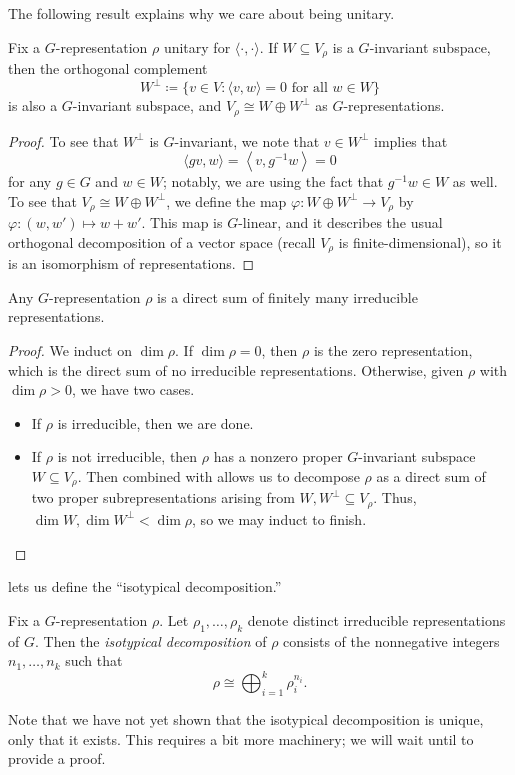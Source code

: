 \documentclass[../main.tex]{subfiles}
\begin{document}
The following result explains why we care about being unitary.
\begin{lemma} \label{lem:get-ortho-comp}
	Fix a $G$-representation $\rho$ unitary for $\langle\cdot,\cdot\rangle$. If $W\subseteq V_\rho$ is a $G$-invariant subspace, then the orthogonal complement
	\[W^\perp\coloneqq\{v\in V:\langle v,w\rangle=0\text{ for all }w\in W\}\]
	is also a $G$-invariant subspace, and $V_\rho\cong W\oplus W^\perp$ as $G$-representations.
\end{lemma}
\begin{proof}
	To see that $W^\perp$ is $G$-invariant, we note that $v\in W^\perp$ implies that
	\[\langle gv,w\rangle=\left\langle v,g^{-1}w\right\rangle=0\]
	for any $g\in G$ and $w\in W$; notably, we are using the fact that $g^{-1}w\in W$ as well. To see that $V_\rho\cong W\oplus W^\perp$, we define the map $\varphi\colon W\oplus W^\perp\to V_\rho$ by $\varphi\colon(w,w')\mapsto w+w'$. This map is $G$-linear, and it describes the usual orthogonal decomposition of a vector space (recall $V_\rho$ is finite-dimensional), so it is an isomorphism of representations.
\end{proof}
\begin{theorem}[Maschke] \label{thm:maschke}
	Any $G$-representation $\rho$ is a direct sum of finitely many irreducible representations.
\end{theorem}
\begin{proof}
	We induct on $\dim\rho$. If $\dim\rho=0$, then $\rho$ is the zero representation, which is the direct sum of no irreducible representations. Otherwise, given $\rho$ with $\dim\rho>0$, we have two cases.
	\begin{itemize}
		\item If $\rho$ is irreducible, then we are done.
		\item If $\rho$ is not irreducible, then $\rho$ has a nonzero proper $G$-invariant subspace $W\subseteq V_\rho$. Then  combined with  allows us to decompose $\rho$ as a direct sum of two proper subrepresentations arising from $W,W^\perp\subseteq V_\rho$. Thus, $\dim W,\dim W^\perp<\dim\rho$, so we may induct to finish.
		\qedhere
	\end{itemize}
\end{proof}
 lets us define the ``isotypical decomposition.''
\begin{definition}
	Fix a $G$-representation $\rho$. Let $\rho_1,\ldots,\rho_k$ denote distinct irreducible representations of $G$. Then the \textit{isotypical decomposition} of $\rho$ consists of the nonnegative integers $n_1,\ldots,n_k$ such that
	\[\rho\cong\bigoplus_{i=1}^k\rho_i^{n_i}.\]
\end{definition}
Note that we have not yet shown that the isotypical decomposition is unique, only that it exists. This requires a bit more machinery; we will wait until  to provide a proof.
\end{document}
